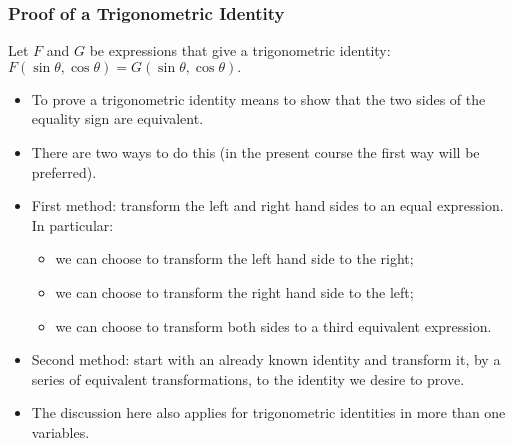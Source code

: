 \begin{frame}
\frametitle{Proof of a Trigonometric Identity}
Let $F$ and $G$ be expressions that give a trigonometric identity:
$
F(\sin\theta, \cos\theta)=G(\sin\theta, \cos \theta).
$
\begin{itemize}
\item<2-> To prove a trigonometric identity means to show that the two sides of the equality sign are equivalent. 
\item<3-> There are two ways to do this (in the present course the first way will be preferred).
\item<4-> First method: transform the left and right hand sides to an equal expression. In particular:
\begin{itemize}
\item<5-> we can choose to transform the left hand side to the right;
\item<6-> we can choose to transform the right hand side to the left;
\item<7-> we can choose to transform both sides to a third equivalent expression.
\end{itemize}
\item<8-> Second method: start with an already known identity and transform it, by a series of equivalent transformations, to the identity we desire to prove.
\item<9-> The discussion here also applies for trigonometric identities in more than one variables.
\end{itemize}
\end{frame}